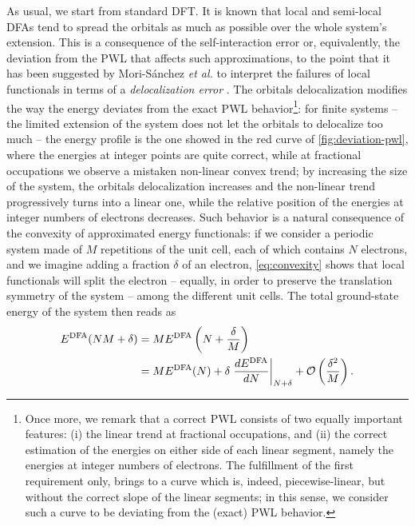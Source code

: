 As usual, we start from standard DFT. It is known that local and semi-local DFAs tend to spread the orbitals as much as possible over the whole system's extension. This is a consequence of the self-interaction error or, equivalently, the deviation from the PWL that affects such approximations, to the point that it has been suggested by Mori-S\'{a}nchez \emph{et al.} to interpret the failures of local functionals in terms of a \emph{delocalization error} \cite{mori-sanchez_localization_2008}. The orbitals delocalization modifies the way the energy deviates from the exact PWL behavior\footnote{Once more, we remark that a correct PWL consists of two equally important features: (i) the linear trend at fractional occupations, and (ii) the correct estimation of the energies on either side of each linear segment, namely the energies at integer numbers of electrons. The fulfillment of the first requirement only, brings to a curve which is, indeed, piecewise-linear, but without the correct slope of the linear segments; in this sense, we consider such a curve to be deviating from the (exact) PWL behavior.}: for finite systems -- the limited extension of the system does not let the orbitals to delocalize too much -- the energy profile is the one showed in the red curve of \cref{fig:deviation-pwl}, where the energies at integer points are quite correct, while at fractional occupations we observe a mistaken non-linear convex trend; by increasing the size of the system, the orbitals delocalization increases and the non-linear trend progressively turns into a linear one, while the relative position of the energies at integer numbers of electrons decreases. Such behavior is a natural consequence of the convexity of approximated energy functionals: if we consider a periodic system made of $M$ repetitions of the unit cell, each of which contains $N$ electrons, and we imagine adding a fraction $\delta$ of an electron, \cref{eq:convexity} shows that local functionals will split the electron -- equally, in order to preserve the translation symmetry of the system -- among the different unit cells. The total ground-state energy of the system then reads as \cite{mori-sanchez_localization_2008,kraisler_fundamental_2014}
%
\begin{equation}
    \begin{split}
    E^{\rm DFA}(NM + \delta) &= M E^{\rm DFA}\left( N + \frac{\delta}{M} \right) \\
    &= ME^{\rm DFA}(N) + \delta \left. \frac{dE^{\rm DFA}}{dN} \right|_{N+\delta} + \mathcal{O} \left( \frac{\delta^2}{M} \right) .
    \end{split}
    \label{eq:pwl-convex-to-linear}
\end{equation}
